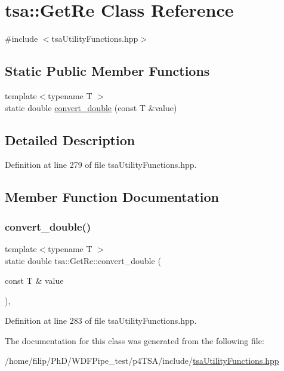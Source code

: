 \hypertarget{classtsa_1_1_get_re}{}\section{tsa\+:\+:Get\+Re Class Reference}
\label{classtsa_1_1_get_re}


{\ttfamily \#include $<$tsa\+Utility\+Functions.\+hpp$>$}

\subsection*{Static Public Member Functions}
\begin{DoxyCompactItemize}
\item 
{\footnotesize template$<$typename T $>$ }\\static double \hyperlink{classtsa_1_1_get_re_a856758bf50794098adfa633da0c905ca}{convert\+\_\+double} (const T \&value)
\end{DoxyCompactItemize}


\subsection{Detailed Description}


Definition at line 279 of file tsa\+Utility\+Functions.\+hpp.



\subsection{Member Function Documentation}
\mbox{\label{classtsa_1_1_get_re_a856758bf50794098adfa633da0c905ca}} 
\subsubsection{\texorpdfstring{convert\+\_\+double()}{convert\_double()}}
{\footnotesize\ttfamily template$<$typename T $>$ \\
static double tsa\+::\+Get\+Re\+::convert\+\_\+double (\begin{DoxyParamCaption}\item[{const T \&}]{value }\end{DoxyParamCaption})\hspace{0.3cm}{\ttfamily [inline]}, {\ttfamily [static]}}



Definition at line 283 of file tsa\+Utility\+Functions.\+hpp.



The documentation for this class was generated from the following file\+:\begin{DoxyCompactItemize}
\item 
/home/filip/\+Ph\+D/\+W\+D\+F\+Pipe\+\_\+test/p4\+T\+S\+A/include/\hyperlink{tsa_utility_functions_8hpp}{tsa\+Utility\+Functions.\+hpp}\end{DoxyCompactItemize}

